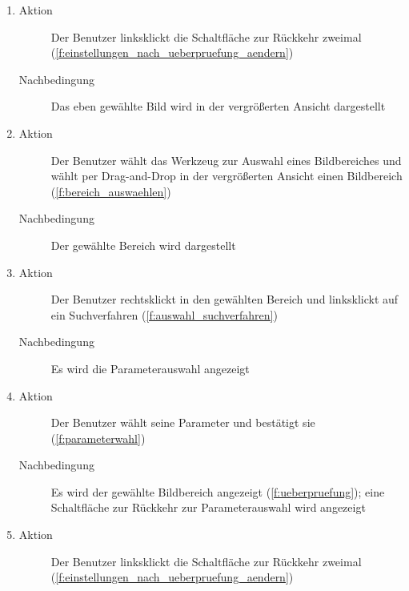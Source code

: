 \begin{enumerate} [label=\bfseries /TS \arabic*0/, leftmargin=*]
\begin{enumerate}[leftmargin=0pt]
\begin{description}
			\item[Aktion] Der Benutzer wählt seine Parameter und bestätigt sie (\ref{f:parameterwahl})
			\item[Nachbedingung] Es wird der gewählte annotierte Bildbereich angezeigt (\ref{f:ueberpruefung}); eine Schaltfläche zur Rückkehr zur Parameterauswahl wird angezeigt
		\end{description}
		\item
		\begin{description}
			\item[Aktion] Der Benutzer linksklickt die Schaltfläche zur Rückkehr zweimal (\ref{f:einstellungen_nach_ueberpruefung_aendern})
			\item[Nachbedingung] Das eben gewählte Bild wird in der vergrößerten Ansicht dargestellt
		\end{description}
		\item
		\begin{description}
			\item[Aktion] Der Benutzer wählt das Werkzeug zur Auswahl eines Bildbereiches und wählt per Drag-and-Drop in der vergrößerten Ansicht einen Bildbereich (\ref{f:bereich_auswaehlen})
			\item[Nachbedingung] Der gewählte Bereich wird dargestellt
		\end{description}
		\item
		\begin{description}
			\item[Aktion] Der Benutzer rechtsklickt in den gewählten Bereich und linksklickt auf ein Suchverfahren (\ref{f:auswahl_suchverfahren})
			\item[Nachbedingung] Es wird die Parameterauswahl angezeigt
		\end{description}
		\item
		\begin{description}
			\item[Aktion] Der Benutzer wählt seine Parameter und bestätigt sie (\ref{f:parameterwahl})
			\item[Nachbedingung] Es wird der gewählte Bildbereich angezeigt (\ref{f:ueberpruefung}); eine Schaltfläche zur Rückkehr zur Parameterauswahl wird angezeigt
		\end{description}
		\item
		\begin{description}
			\item[Aktion] Der Benutzer linksklickt die Schaltfläche zur Rückkehr zweimal (\ref{f:einstellungen_nach_ueberpruefung_aendern})

\end{description}
\end{enumerate}
\end{enumerate}
